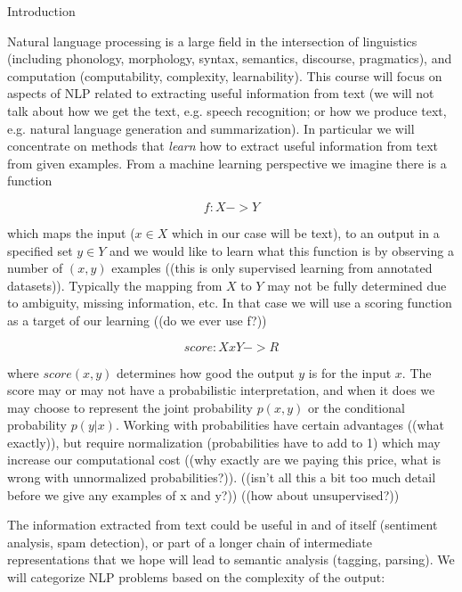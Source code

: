 Introduction

Natural language processing is a large field in the intersection of
linguistics (including phonology, morphology, syntax, semantics,
discourse, pragmatics), and computation (computability, complexity,
learnability).  This course will focus on aspects of NLP related to
extracting useful information from text (we will not talk about how we
get the text, e.g. speech recognition; or how we produce text,
e.g. natural language generation and summarization).  In particular we
will concentrate on methods that {\em learn} how to extract useful
information from text from given examples.  From a machine learning
perspective we imagine there is a function 

\[ f: X -> Y \]

which maps the input ($x \in X$ which in our case will be text), to an
output in a specified set $y \in Y$ and we would like to learn what
this function is by observing a number of $(x, y)$ examples ((this is
only supervised learning from annotated datasets)).  Typically the
mapping from $X$ to $Y$ may not be fully determined due to ambiguity,
missing information, etc.  In that case we will use a scoring function
as a target of our learning ((do we ever use f?))

\[ score: X x Y -> R \]

where $score(x, y)$ determines how good the output $y$ is for the
input $x$.  The score may or may not have a probabilistic
interpretation, and when it does we may choose to represent the joint
probability $p(x, y)$ or the conditional probability $p(y|x)$.
Working with probabilities have certain advantages ((what exactly)),
but require normalization (probabilities have to add to 1) which may
increase our computational cost ((why exactly are we paying this
price, what is wrong with unnormalized probabilities?)).  ((isn't all
this a bit too much detail before we give any examples of x and y?))
((how about unsupervised?))

The information extracted from text could be useful in and of itself
(sentiment analysis, spam detection), or part of a longer chain of
intermediate representations that we hope will lead to semantic
analysis (tagging, parsing).  We will categorize NLP problems based on
the complexity of the output:

